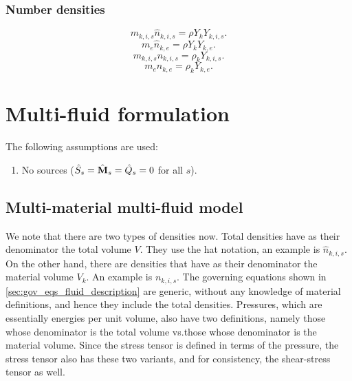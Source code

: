 \documentclass[a4paper,11pt]{report}
\begin{document}
\subsubsection{Number densities}
\begin{equation}
    \label{eq:mm_mass_number_densities_i_hat}
    m_{k,i,s} \hat{n}_{k,i,s} = \rho Y_k Y_{k,i,s}.
\end{equation}
\begin{equation}
    \label{eq:mm_mass_number_densities_e_hat}
    m_e \hat{n}_{k,e} = \rho Y_k Y_{k,e}.
\end{equation}
\begin{equation}
    \label{eq:mm_mass_number_densities_i}
    m_{k,i,s} n_{k,i,s} = \rho_k Y_{k,i,s}.
\end{equation}
\begin{equation}
    \label{eq:mm_mass_number_densities_e}
    m_e n_{k,e} = \rho_k Y_{k,e}.
\end{equation}

\section{Multi-fluid formulation}
The following assumptions are used:
\begin{enumerate}
    \item No sources ($\hat{S}_s = \hat{\mathbf{M}}_s = \hat{Q}_s = 0$ for all $s$).
\end{enumerate}

\subsection{Multi-material multi-fluid model}
We note that there are two types of densities now. Total densities have as their denominator the total volume $V$. They use the hat notation, an example is $\hat{n}_{k,i,s}$. On the other hand, there are densities that have as their denominator the material volume $V_k$. An example is $n_{k,i,s}$. The governing equations shown in \cref{sec:gov_eqs_fluid_description} are generic, without any knowledge of material definitions, and hence they include the total densities. Pressures, which are essentially energies per unit volume, also have two definitions, namely those whose denominator is the total volume vs.\@ those whose denominator is the material volume. Since the stress tensor is defined in terms of the pressure, the stress tensor also has these two variants, and for consistency, the shear-stress tensor as well.
\end{document}
